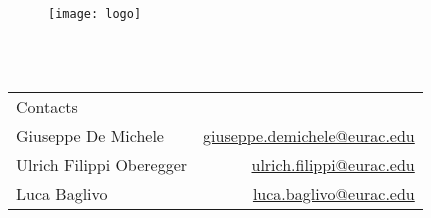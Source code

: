 \begin{titlepage}
\thispagestyle{empty}


\begin{center}
\end{center}

\begin{figure}[h]
     \begin{center}
         \texttt{[image: logo]}
     \end{center}
     \label{fig:logo_uni}
 \end{figure}

\vspace{4 cm}

\begin{center} 
\\
\vspace{0.5 cm}
\\

\end{center}


\vspace{5 cm}

\begin{tabular}{lr}  
 
Contacts	&			\\

Giuseppe De Michele		& \href{mailto:giuseppe.demichele@eurac.edu}{giuseppe.demichele@eurac.edu}	 			\\
Ulrich Filippi Oberegger		&	\href{mailto:ulrich.filippi@eurac.edu}{ulrich.filippi@eurac.edu}				\\
Luca Baglivo 		&		\href{mailto:luca.baglivo@eurac.edu}{luca.baglivo@eurac.edu}			\\
\end{tabular}

\end{titlepage}
